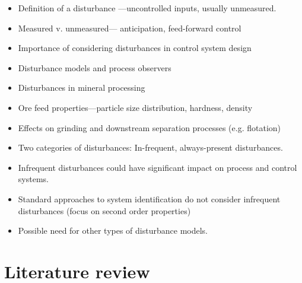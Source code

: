 \begin{itemize}
	\item Definition of a disturbance —uncontrolled inputs, usually unmeasured.
	\item Measured v. unmeasured— anticipation, feed-forward control
	\item Importance of considering disturbances in control system design
	\item Disturbance models and process observers
	\item Disturbances in mineral processing
	\item Ore feed properties—particle size distribution, hardness, density
	\item Effects on grinding and downstream separation processes (e.g. flotation)
	\item Two categories of disturbances: In-frequent, always-present disturbances.
	\item Infrequent disturbances could have significant impact on process and control systems.
	\item Standard approaches to system identification do not consider infrequent disturbances (focus on second order properties)
	\item Possible need for other types of disturbance models.
\end{itemize}


\section*{Literature review}

